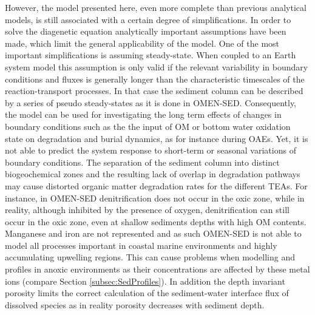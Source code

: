 \documentclass[gmd, manuscript]{copernicus}
\begin{document}
However, the model presented here, even more complete than previous analytical models, is still associated with a certain degree of simplifications. In order to solve the diagenetic equation analytically important assumptions have been made, which limit 
the general applicability of the model. One of the most important simplifications is assuming steady-state. 
When coupled to an Earth system model this assumption is only valid if the relevant variability in boundary conditions and fluxes is generally longer than the characteristic timescales of the reaction-transport processes. 
In that case the sediment column can be described by a series of pseudo steady-states as it is done in OMEN-SED. Consequently, the model can be used for investigating the long term effects of changes in boundary conditions such as the the input of OM 
or bottom water oxidation state on degradation and burial dynamics, as for instance during OAEs. Yet, it is not able to predict the system response to short-term or seasonal variations of boundary conditions. 
The separation of the sediment column into distinct biogeochemical zones and the resulting lack of overlap in degradation pathways may cause distorted organic matter degradation rates for the different TEAs. 
For instance, in OMEN-SED denitrification does not occur in the oxic zone, while in reality, although inhibited by the presence of oxygen, denitrification can still occur in the oxic zone, even at shallow sediments depths with high OM contents. 
Manganese and iron are not represented and as such OMEN-SED is not able to model all processes important in coastal marine environments and highly accumulating upwelling regions. This can cause problems when modelling  and  
profiles in anoxic environments as their concentrations are affected by these metal ions (compare Section \ref{subsec:SedProfiles}). 
In addition the depth invariant porosity limits the correct calculation of the sediment-water interface flux of dissolved species as in reality porosity decreases with sediment depth. 


\end{document}
